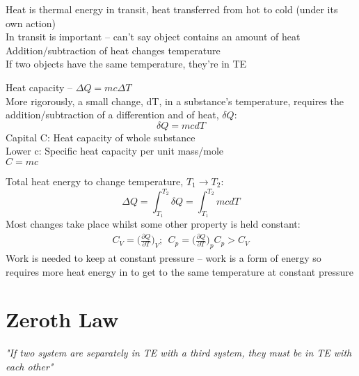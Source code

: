 \documentclass[a4paper, 11pt, fleqn, normalem]{report}
\begin{document}
Heat is thermal energy in transit, heat transferred from hot to cold (under its own action) \\
In transit is important -- can't say object contains an amount of heat \\
Addition/subtraction of heat changes temperature \\
If two objects have the same temperature, they're in TE

Heat capacity -- $\Delta Q = mc\Delta T$ \\
More rigorously, a small change, dT, in a substance's temperature, requires the addition/subtraction of a differention and of heat,  $\delta Q$:
\begin{equation*}
    \delta Q = mcdT
\end{equation*}
Capital C: Heat capacity of whole substance \\
Lower c: Specific heat capacity per unit mass/mole \\
$C = mc$

Total heat energy to change temperature, $T_1 \to T_2$:
\begin{equation*}
    \Delta Q = \int_{T_{1}}^{T_{2}} \delta Q = \int_{T_1}^{T_2} mcdT
\end{equation*}
Most changes take place whilst some other property is held constant:
\begin{gather*}
    C_{V} = \Big(\frac{\partial Q}{\partial T}\Big)_{V};~~ C_{p} = \Big(\frac{\partial Q}{\partial T}\Big)_{p}
    C_{p} > C_{V}
\end{gather*}
Work is needed to keep at constant pressure -- work is a form of energy so requires more heat energy in to get to the same temperature at constant pressure

\section{Zeroth Law}
\emph{"If two system are separately in TE with a third system, they must be in TE with each other"}
\end{document}
